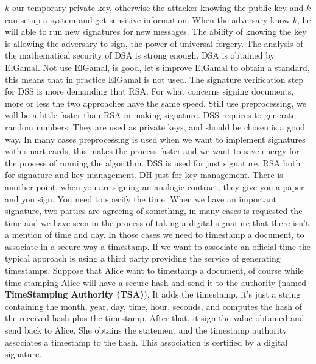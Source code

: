 \documentclass[11pt]{article}
\begin{document}
$k$ our temporary private key, otherwise the attacker knowing the public key and $k$ can setup a system and get sensitive information. When the adversary know $k$, he will able to run new signatures for new messages. The ability of knowing the key is allowing the adversary to sign, the power of universal forgery. The analysis of the mathematical security of DSA is strong enough. DSA is obtained by ElGamal. Not use ElGamal, is good, let's improve ElGamal to obtain a standard, this means that in practice ElGamal is not used. The signature verification step for DSS is more demanding that RSA. For what concerns signing documents, more or less the two approaches have the same speed. Still use preprocessing, we will be a little faster than RSA in making signature. DSS requires to generate random numbers. They are used as private keys, and should be chosen is a good way. In many cases preprocessing is used when we want to implement signatures with smart cards, this makes the process faster and we want to save energy for the process of running the algorithm. DSS is used for just signature, RSA both for signature and key management. DH just for key management. There is another point, when you are signing an analogic contract, they give you a paper and you sign. You need to specify the time. When we have an important signature, two parties are agreeing of something, in many cases is requested the time and we have seen in the process of taking a digital signature that there isn't a mention of time and day. In those cases we need to timestamp a document, to associate in a secure way a timestamp. If we want to associate an official time the typical approach is using a third party providing the service of generating timestamps. Suppose that Alice want to timestamp a document, of course while time-stamping Alice will have a secure hash and send it to the authority (named \textbf{TimeStamping Authority (TSA)}). It adds the timestamp, it's just a string containing the month, year, day, time, hour, seconds, and computes the hash of the received hash plus the timestamp. After that, it sign the value obtained and send back to Alice. She obtains the statement and the timestamp authority associates a timestamp to the hash. This association is certified by a digital signature.
\end{document}
